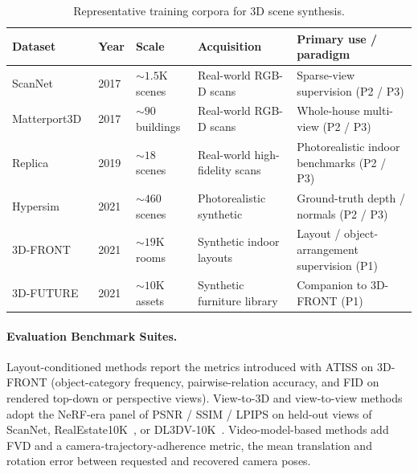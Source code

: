 \begin{table}[t]
    \centering
    \fontsize{8}{10}\selectfont
    \setlength{\tabcolsep}{1.0mm}
    \caption{Representative training corpora for 3D scene synthesis.}
    \label{tab:p3_s8_2_2_corpora}
    \begin{tabular}{L{0.20\textwidth} C{0.07\textwidth} C{0.14\textwidth} L{0.22\textwidth} L{0.29\textwidth}}
        \toprule
        \textbf{Dataset} & \textbf{Year} & \textbf{Scale} & \textbf{Acquisition} & \textbf{Primary use / paradigm} \\
        \midrule
        ScanNet~\cite{dai2017scannet} & 2017 & ${\sim}1.5\mathrm{K}$ scenes & Real-world RGB-D scans & Sparse-view supervision (P2 / P3) \\
        Matterport3D~\cite{chang2017matterport3d} & 2017 & ${\sim}90$ buildings & Real-world RGB-D scans & Whole-house multi-view (P2 / P3) \\
        Replica~\cite{straub2019replica} & 2019 & ${\sim}18$ scenes & Real-world high-fidelity scans & Photorealistic indoor benchmarks (P2 / P3) \\
        Hypersim~\cite{roberts2021hypersim} & 2021 & ${\sim}460$ scenes & Photorealistic synthetic & Ground-truth depth / normals (P2 / P3) \\
        3D-FRONT~\cite{fu20213dfront} & 2021 & ${\sim}19\mathrm{K}$ rooms & Synthetic indoor layouts & Layout / object-arrangement supervision (P1) \\
        3D-FUTURE~\cite{fu20213dfuture} & 2021 & ${\sim}10\mathrm{K}$ assets & Synthetic furniture library & Companion to 3D-FRONT (P1) \\
        \bottomrule
    \end{tabular}
\end{table}

\paragraph{Evaluation Benchmark Suites.}
Layout-conditioned methods report the metrics introduced with ATISS on 3D-FRONT (object-category frequency, pairwise-relation accuracy, and FID on rendered top-down or perspective views).
View-to-3D and view-to-view methods adopt the NeRF-era panel of PSNR / SSIM / LPIPS on held-out views of ScanNet, RealEstate10K~\cite{zhou2018stereo}, or DL3DV-10K~\cite{ling2024dl3dv}.
Video-model-based methods add FVD and a camera-trajectory-adherence metric, the mean translation and rotation error between requested and recovered camera poses.

